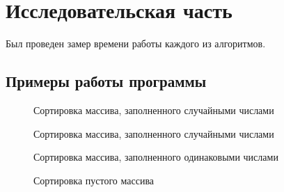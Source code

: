 \documentclass[12pt]{report}
\begin{document}
\chapter{Исследовательская часть}
Был проведен замер времени работы каждого из алгоритмов.

\section{Примеры работы программы}
\begin{figure}[h]
\caption{Сортировка массива, заполненного случайными числами}
\label{ris:image}
\end{figure}
\newpage
\begin{figure}[h]
\caption{Сортировка массива, заполненного случайными числами}
\label{ris:image}
\end{figure}

\begin{figure}[h]
\caption{Сортировка массива, заполненного одинаковыми числами}
\label{ris:image}
\end{figure}
\newpage
\begin{figure}[h]
\caption{Сортировка пустого массива}
\label{ris:image}
\end{figure}
\end{document}
